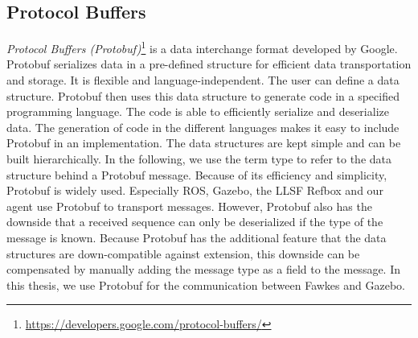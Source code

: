 \subsection{Protocol Buffers}
\textit{Protocol Buffers (Protobuf)}\footnote{\url{https://developers.google.com/protocol-buffers/}} is a data interchange format developed by Google. Protobuf serializes data in a pre-defined structure for efficient data transportation and storage. It is flexible and language-independent. The user can define a data structure. Protobuf then uses this data structure to generate code in a specified programming language. The code is able to efficiently serialize and deserialize data. The generation of code in the different languages makes it easy to include Protobuf in an implementation. The data structures are kept simple and can be built hierarchically. In the following, we use the term type to refer to the data structure behind a Protobuf message. Because of its efficiency and simplicity, Protobuf is widely used. Especially ROS, Gazebo, the LLSF Refbox and our agent use Protobuf to transport messages. However, Protobuf also has the downside that a received sequence can only be deserialized if the type of the message is known. Because Protobuf has the additional feature that the data structures are down-compatible against extension, this downside can be compensated by manually adding the message type as a field to the message. In this thesis, we use Protobuf for the communication between Fawkes and Gazebo.

